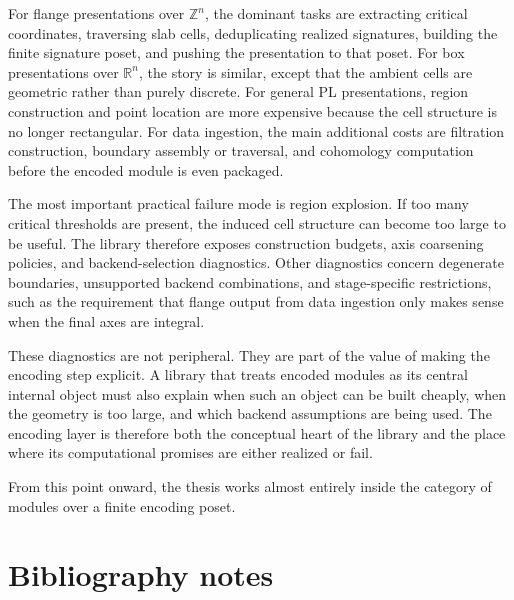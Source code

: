 \documentclass[11pt]{article}
\newcommand{\R}{\mathbb{R}}
\newcommand{\Z}{\mathbb{Z}}
\theoremstyle{definition}
\theoremstyle{remark}
\begin{document}
For flange presentations over $\Z^n$, the dominant tasks are extracting critical coordinates, traversing slab cells, deduplicating realized signatures, building the finite signature poset, and pushing the presentation to that poset.  For box presentations over $\R^n$, the story is similar, except that the ambient cells are geometric rather than purely discrete.  For general PL presentations, region construction and point location are more expensive because the cell structure is no longer rectangular.  For data ingestion, the main additional costs are filtration construction, boundary assembly or traversal, and cohomology computation before the encoded module is even packaged.

The most important practical failure mode is region explosion.  If too many critical thresholds are present, the induced cell structure can become too large to be useful.  The library therefore exposes construction budgets, axis coarsening policies, and backend-selection diagnostics.  Other diagnostics concern degenerate boundaries, unsupported backend combinations, and stage-specific restrictions, such as the requirement that flange output from data ingestion only makes sense when the final axes are integral.

These diagnostics are not peripheral.  They are part of the value of making the encoding step explicit.  A library that treats encoded modules as its central internal object must also explain when such an object can be built cheaply, when the geometry is too large, and which backend assumptions are being used.  The encoding layer is therefore both the conceptual heart of the library and the place where its computational promises are either realized or fail.

From this point onward, the thesis works almost entirely inside the category of modules over a finite encoding poset.


\section{Bibliography notes}\label{app:bibliography-notes}
\end{document}
